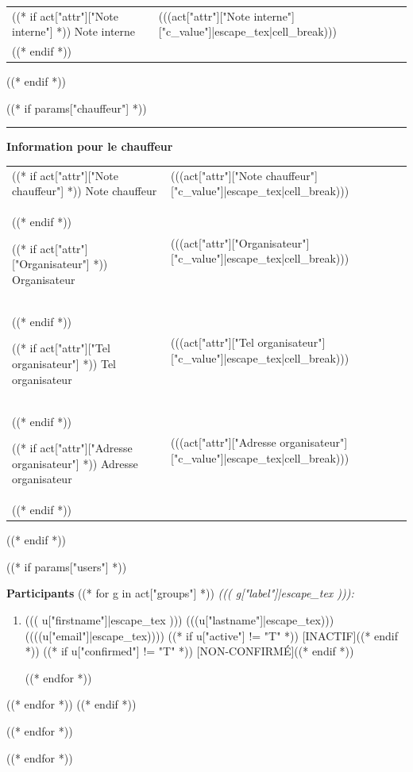 \documentclass [parskip=full, paper=a4paper]{scrbook}
\begin{document}
\begin{minipage}[t]{\textwidth}
\begin{tabulary}{0.9\textwidth}{p{4cm}|L}
((* if act["attr"]["Note interne"] *))
Note interne & (((act["attr"]["Note interne"]["c_value"]|escape_tex|cell_break))) \\
((* endif *))

\end{tabulary}
((* endif *))

((* if params["chauffeur"] *))
\rule{\textwidth}{1pt}

\medskip

\textbf{Information pour le chauffeur}
\medskip

\begin{tabulary}{0.9\textwidth}{p{4cm}|L}

((* if act["attr"]["Note chauffeur"] *))
Note chauffeur & (((act["attr"]["Note chauffeur"]["c_value"]|escape_tex|cell_break))) \\
((* endif *))

((* if act["attr"]["Organisateur"] *))
Organisateur & (((act["attr"]["Organisateur"]["c_value"]|escape_tex|cell_break))) \\
((* endif *))

((* if act["attr"]["Tel organisateur"] *))
Tel organisateur & (((act["attr"]["Tel organisateur"]["c_value"]|escape_tex|cell_break))) \\
((* endif *))

((* if act["attr"]["Adresse organisateur"] *))
Adresse organisateur & (((act["attr"]["Adresse organisateur"]["c_value"]|escape_tex|cell_break))) \\
((* endif *))
\end{tabulary}

((* endif *))


((* if params["users"] *))
\medskip

\textbf{Participants}
\medskip
((* for g in act["groups"] *))
\textit{((( g["label"]|escape_tex ))):}

\begin{enumerate}[noitemsep]
((* for u in g["users"] *))
\item ((( u["firstname"]|escape_tex )))
(((u["lastname"]|escape_tex)))
{(}(((u["email"]|escape_tex))){)}
((* if u["active"] != "T" *)) [INACTIF]((* endif *))
((* if u["confirmed"] != "T" *)) [NON-CONFIRMÉ]((* endif *))

((* endfor *))
\end{enumerate}

((* endfor *))
((* endif *))

\end{minipage}
((* endfor *))

((* endfor *))

\end{document}
